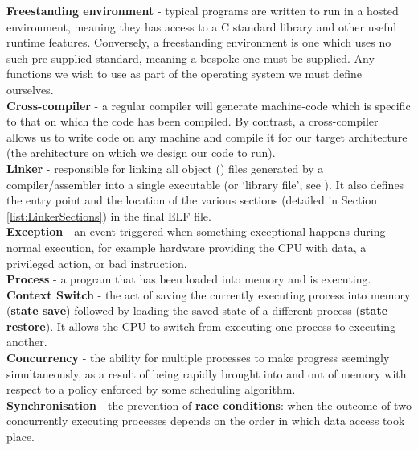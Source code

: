     \noindent \textbf{Freestanding environment} - typical programs are written
    to run in a hosted environment, meaning they has access to a C standard
    library and other useful runtime features. Conversely, a freestanding
    environment is one which uses no such pre-supplied standard, meaning a
    bespoke one must be supplied. Any functions we wish to use as part of the
    operating system we must define ourselves. \\

    \noindent \textbf{Cross-compiler} - a regular compiler will generate
    machine-code which is specific to that on which the code has been compiled.
    By contrast, a  cross-compiler allows us to write code on any machine and
    compile it for our target architecture (the architecture on which we design
    our code to run). \\

    \noindent \textbf{Linker} - responsible for linking all object ()
    files generated by a compiler/assembler into a single executable (or
    `library file', see \cite{StaticLibrary}). It also defines the entry point
    and the location of the various sections (detailed in Section
    \ref{list:LinkerSections}) in the final ELF file.\\

    \noindent \textbf{Exception} - an event triggered when something exceptional
    happens during normal execution, for example hardware providing the CPU with
    data, a privileged action, or bad instruction. \\

    \noindent \textbf{Process} - a program that has been loaded into memory and is
    executing. \\

    \noindent \textbf{Context Switch} - the act of saving the currently executing process
    into memory (\textbf{state save}) followed by loading the saved state of a
    different process (\textbf{state restore}). It allows the CPU to switch from
    executing one process to executing another. \\

    \noindent \textbf{Concurrency} - the ability for multiple processes to make
    progress seemingly simultaneously, as a result of being rapidly brought into
    and out of memory with respect to a policy enforced by some scheduling
    algorithm. \\

    \noindent \textbf{Synchronisation} - the prevention of \textbf{race
    conditions}: when the outcome of two concurrently executing processes
    depends on the order in which data access took place. \\

